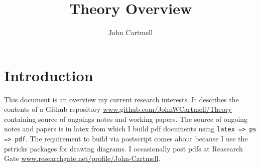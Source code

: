 \documentclass[10pt,a4paper]{article}
\theoremstyle{remark}
\begin{document}
\title{Theory Overview}

\author{John Cartmell}

\maketitle

\section{Introduction}
\note This document is an overview my current research interests. It describes the contents of  a Github repository \url{www.github.com/JohnWCartmell/Theory} containing source of ongoings notes and working papers. 
\note The source of ongoing notes and papers is in latex from which I  build pdf documents using \verb!latex => ps => pdf!. The requirement to build via postscript comes about because I use the pstricks packages for drawing diagrams.
\note I occasionally post pdfs at Reasearch Gate \url{www.researchgate.net/profile/John-Cartmell}.
\end{document}
